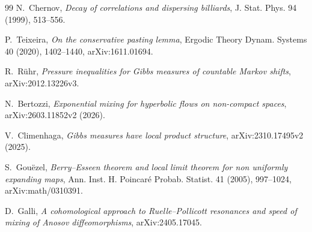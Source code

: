 \documentclass[11pt]{article}
\begin{document}
\begin{thebibliography}{99}
N.~Chernov,
\emph{Decay of correlations and dispersing billiards},
J. Stat. Phys. 94 (1999), 513--556.

P.~Teixeira,
\emph{On the conservative pasting lemma},
Ergodic Theory Dynam. Systems 40 (2020), 1402--1440,
arXiv:1611.01694.

R.~R\"uhr,
\emph{Pressure inequalities for Gibbs measures of countable Markov shifts},
arXiv:2012.13226v3.

N.~Bertozzi,
\emph{Exponential mixing for hyperbolic flows on non-compact spaces},
arXiv:2603.11852v2 (2026).

V.~Climenhaga,
\emph{Gibbs measures have local product structure},
arXiv:2310.17495v2 (2025).

S.~Gou\"ezel,
\emph{Berry--Esseen theorem and local limit theorem for non uniformly
expanding maps}, Ann. Inst. H. Poincar\'e Probab. Statist. 41 (2005),
997--1024, arXiv:math/0310391.

D.~Galli,
\emph{A cohomological approach to Ruelle--Pollicott resonances and speed of
mixing of Anosov diffeomorphisms}, arXiv:2405.17045.
\end{thebibliography}
\endgroup
\end{document}
